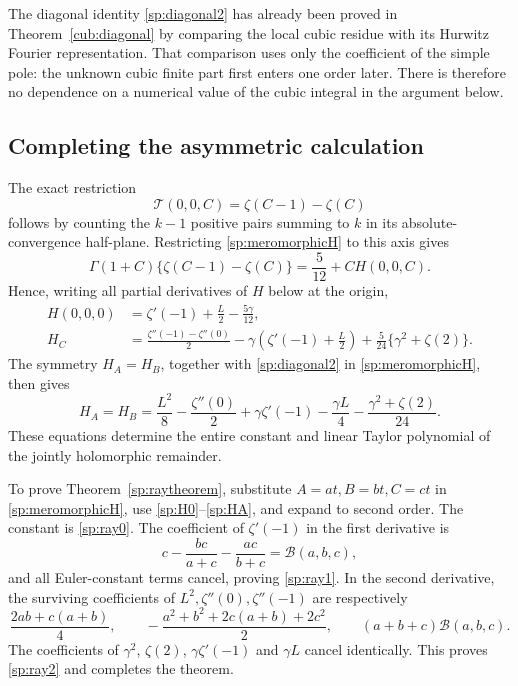 \documentclass[11pt,a4paper]{article}
\theoremstyle{definition}
\theoremstyle{remark}
\numberwithin{equation}{section}
\begin{document}
The diagonal identity \eqref{sp:diagonal2} has already been proved in
Theorem~\ref{cub:diagonal} by comparing the local cubic residue with
its Hurwitz Fourier representation. That comparison uses only the
coefficient of the simple pole: the unknown cubic finite part first
enters one order later. There is therefore no dependence on a numerical
value of the cubic integral in the argument below.

\subsection{Completing the asymmetric calculation}

The exact restriction
\begin{equation}\label{sp:axis}
 \mathcal T(0,0,C)=\zeta(C-1)-\zeta(C)
\end{equation}
follows by counting the $k-1$ positive pairs summing to $k$ in its
absolute-convergence half-plane.  Restricting
\eqref{sp:meromorphicH} to this axis gives
\[
 \Gamma(1+C)\{\zeta(C-1)-\zeta(C)\}
       =\frac5{12}+C H(0,0,C).
\]
Hence, writing all partial derivatives of $H$ below at the origin,
\begin{align}
 H(0,0,0)
   &=\zeta'(-1)+\frac L2-\frac{5\gamma}{12},\label{sp:H0}\\
 H_C
   &=\frac{\zeta''(-1)-\zeta''(0)}2
       -\gamma\left(\zeta'(-1)+\frac L2\right)
       +\frac5{24}\{\gamma^2+\zeta(2)\}.
       \label{sp:HC}
\end{align}
The symmetry $H_A=H_B$, together with \eqref{sp:diagonal2} in
\eqref{sp:meromorphicH}, then gives
\begin{equation}\label{sp:HA}
 H_A=H_B=\frac{L^2}{8}-\frac{\zeta''(0)}2
         +\gamma\zeta'(-1)-\frac{\gamma L}{4}
         -\frac{\gamma^2+\zeta(2)}{24}.
\end{equation}
These equations determine the entire constant and linear Taylor
polynomial of the jointly holomorphic remainder.

To prove Theorem~\ref{sp:raytheorem}, substitute
$A=at,B=bt,C=ct$ in \eqref{sp:meromorphicH}, use
\eqref{sp:H0}--\eqref{sp:HA}, and expand to second order.  The
constant is \eqref{sp:ray0}.  The coefficient of $\zeta'(-1)$ in
the first derivative is
\[
 c-\frac{bc}{a+c}-\frac{ac}{b+c}
       =\mathcal B(a,b,c),
\]
and all Euler-constant terms cancel, proving \eqref{sp:ray1}.
In the second derivative, the surviving coefficients of
$L^2,\zeta''(0),\zeta''(-1)$ are respectively
\[
 \frac{2ab+c(a+b)}4,\qquad
 -\frac{a^2+b^2+2c(a+b)+2c^2}{2},\qquad
 (a+b+c)\mathcal B(a,b,c).
\]
The coefficients of $\gamma^2$, $\zeta(2)$,
$\gamma\zeta'(-1)$ and $\gamma L$ cancel identically.  This proves
\eqref{sp:ray2} and completes the theorem.
\end{document}
